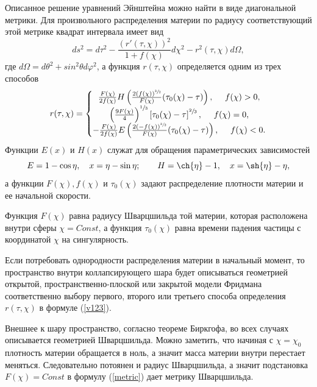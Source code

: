 \documentclass[12pt]{article}
\newcommand{\bq}{\begin{equation}}
\newcommand{\eq}{\end{equation}}
\begin{document}
Описанное решение уравнений Эйнштейна можно найти в виде диагональной метрики. Для произвольного распределения материи по радиусу
соответствующий этой метрике квадрат интервала имеет вид \cite{landavshic2}
\bq
\label{metric}
	d s^2 = d \tau^2 - \frac{(r'(\tau, \chi))^2}{1+f(\chi)} d\chi^2 - r^2(\tau, \chi) d \Omega,
\eq
где $d\Omega=d\theta^2+sin^2\theta d\varphi^2$, а
функция $r(\tau, \chi)$ определяется одним из трех способов
\bq
\label{v123}
	r(\tau, \chi) = \left\{
	\begin{matrix}
	\frac{F(\chi)}{2 f(\chi)} H \left( \frac{2(f(\chi))^{\sfrac{3}{2}} }{F(\chi)}(\tau_0(\chi)-\tau)  \right) , \ \ \ \ f(\chi) > 0,\\
	\left( \frac{9F(\chi)}{4} \right)^{\sfrac{1}{3}} \left[ \tau_0(\chi)- \tau \right]^{\sfrac{2}{3}}, \ \ \ \ f(\chi) = 0, \\
	- \frac{F(\chi)}{2 f(\chi)} E \left( \frac{2(-f(\chi))^{\sfrac{3}{2}} }{F(\chi)}(\tau_0(\chi)-\tau) \right), \ \ \ \ f(\chi) < 0.
	\end{matrix} \right.
\eq
Функции $E(x)$ и $H(x)$  служат для обращения параметрических зависимостей
\bq
E = 1 - \cos{\eta},\quad x = \eta - \sin{\eta};\qquad
H = \ch{\eta}-1,\quad x = \sh{\eta} - \eta,
\eq
а функции $F(\chi), f(\chi)$ и $\tau_0(\chi)$ задают распределение плотности материи и ее начальной скорости.

Функция $F(\chi)$ равна радиусу Шварцшильда той материи, которая расположена внутри сферы $\chi = Const$, а функция $\tau_0(\chi)$ равна времени падения частицы с координатой $\chi$ на сингулярность. 

Если потребовать однородности распределения материи в начальный момент, то пространство внутри коллапсирующего шара будет описываться геометрией открытой, пространственно-плоской или закрытой модели Фридмана соответственно выбору первого, второго или третьего способа определения $r(\tau, \chi)$ в формуле (\ref{v123}).

Внешнее к шару пространство, согласно теореме Биркгофа, во всех случаях описывается геометрией Шварцшильда.
Можно заметить, что начиная с $\chi = \chi_0$ плотность материи обращается в ноль, а значит масса материи внутри перестает меняться. Следовательно потоянен и радиус Шварцшильда, а значит подстановка $F(\chi) = Const$ в формулу (\ref{metric}) дает метрику Шварцшильда.
\end{document}

